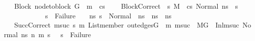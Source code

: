 \begin{isabellebody}
\ \ \ Block{\isacharcolon}{\kern0pt}\ {\isachardoublequoteopen}node{\isacharunderscore}{\kern0pt}to{\isacharunderscore}{\kern0pt}block\ G\ {\isacharbang}{\kern0pt}\ m\ {\isacharequal}{\kern0pt}\ cs{\isachardoublequoteclose}\ \isanewline
\ \ \ BlockCorrect{\isacharcolon}{\kern0pt}\ {\isachardoublequoteopen}{\isasymAnd}\ s{\isacharprime}{\kern0pt}{\isacharprime}{\kern0pt}{\isachardot}{\kern0pt}\ M{\isacharcomma}{\kern0pt}{\isasymLambda}{\isacharcomma}{\kern0pt}{\isasymGamma}{\isacharcomma}{\kern0pt}{\isasymOmega}\ {\isasymturnstile}\ {\isasymlangle}cs{\isacharcomma}{\kern0pt}\ Normal\ n{\isacharunderscore}{\kern0pt}s{\isasymrangle}\ {\isacharbrackleft}{\kern0pt}{\isasymrightarrow}{\isacharbrackright}{\kern0pt}\ s{\isacharprime}{\kern0pt}{\isacharprime}{\kern0pt}\ {\isasymLongrightarrow}\ \isanewline
\ \ \ \ \ \ \ \ \ \ \ \ s{\isacharprime}{\kern0pt}{\isacharprime}{\kern0pt}\ {\isasymnoteq}\ Failure\ {\isasymand}\ {\isacharparenleft}{\kern0pt}{\isasymforall}\ \ n{\isacharunderscore}{\kern0pt}s{\isacharprime}{\kern0pt}{\isachardot}{\kern0pt}\ {\isacharparenleft}{\kern0pt}{\isacharparenleft}{\kern0pt}s{\isacharprime}{\kern0pt}{\isacharprime}{\kern0pt}\ {\isacharequal}{\kern0pt}\ {\isacharparenleft}{\kern0pt}Normal\ \ n{\isacharunderscore}{\kern0pt}s{\isacharprime}{\kern0pt}{\isacharparenright}{\kern0pt}{\isacharparenright}{\kern0pt}\ {\isasymlongrightarrow}\ {\isacharparenleft}{\kern0pt}n{\isacharunderscore}{\kern0pt}s{\isacharprime}{\kern0pt}\ {\isacharequal}{\kern0pt}\ n{\isacharunderscore}{\kern0pt}s{\isacharparenright}{\kern0pt}{\isacharparenright}{\kern0pt}{\isacharparenright}{\kern0pt}{\isachardoublequoteclose}\ \isanewline
\ \ \ SuccCorrect{\isacharcolon}{\kern0pt}{\isachardoublequoteopen}{\isasymAnd}\ msuc\ s{}\ m{}{\isachardot}{\kern0pt}\ List{\isachardot}{\kern0pt}member\ {\isacharparenleft}{\kern0pt}out{\isacharunderscore}{\kern0pt}edges{\isacharparenleft}{\kern0pt}G{\isacharparenright}{\kern0pt}\ {\isacharbang}{\kern0pt}\ m{\isacharparenright}{\kern0pt}\ msuc\ {\isasymLongrightarrow}\ M{\isacharcomma}{\kern0pt}{\isasymLambda}{\isacharcomma}{\kern0pt}{\isasymGamma}{\isacharcomma}{\kern0pt}{\isasymOmega}{\isacharcomma}{\kern0pt}G\ {\isasymturnstile}\ {\isacharparenleft}{\kern0pt}Inl{\isacharparenleft}{\kern0pt}msuc{\isacharparenright}{\kern0pt}{\isacharcomma}{\kern0pt}\ Normal\ n{\isacharunderscore}{\kern0pt}s{\isacharparenright}{\kern0pt}\ {\isacharminus}{\kern0pt}n{\isasymrightarrow}{\isacharasterisk}{\kern0pt}\ {\isacharparenleft}{\kern0pt}m{}{\isacharcomma}{\kern0pt}\ s{}{\isacharparenright}{\kern0pt}\ {\isasymLongrightarrow}\ \ s{}\ {\isasymnoteq}\ Failure{\isachardoublequoteclose}\isanewline

\end{isabellebody}
